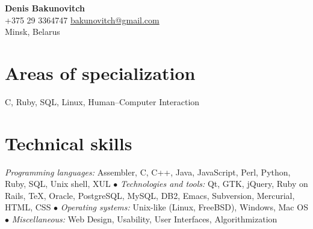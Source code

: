\documentclass[12pt, a4paper]{article}
\begin{document}
	\newlength{\rcollength}\setlength{\rcollength}{1.85in}%

	\textbf{\Huge Denis Bakunovitch}\\
	+375 29 3364747 \hfill \href{mailto:bakunovitch@gmail.com}{bakunovitch@gmail.com}\\
	Minsk, Belarus\\
	\quad\pagebreak[2]
	\hrulefill

	\section*{Areas of specialization}
	C, Ruby, SQL, Linux, Human--Computer Interaction

	\section*{Technical skills}
	\textit{Programming languages:} Assembler, C, C++, Java, JavaScript, Perl, Python, Ruby, SQL, Unix
	shell, XUL $\bullet$
	\textit{Technologies and tools:} Qt, GTK, jQuery, Ruby on Rails, \TeX, Oracle, PostgreSQL,
	MySQL, DB2, Emacs, Subversion, Mercurial, HTML, CSS $\bullet$
	\textit{Operating systems:} Unix-like (Linux, FreeBSD), Windows, Mac
	OS $\bullet$
	\textit{Miscellaneous:} Web Design, Usability, User Interfaces,
	Algorithmization
\end{document}
